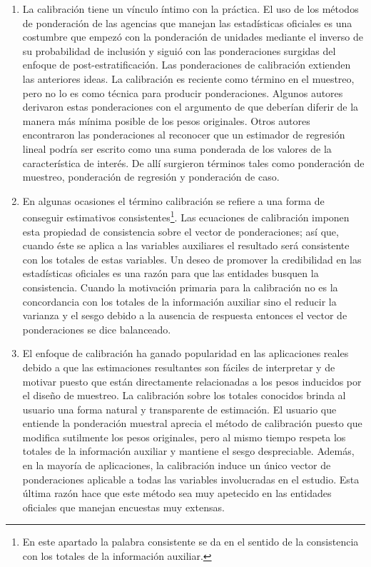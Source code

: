 \documentclass[
  12pt,
  spanish,
]{book}
\begin{document}
\begin{enumerate}
\def\labelenumi{\arabic{enumi}.}
\item
  La calibración tiene un vínculo íntimo con la práctica. El uso de los métodos de ponderación de las agencias que manejan las estadísticas oficiales es una costumbre que empezó con la ponderación de unidades mediante el inverso de su probabilidad de inclusión y siguió con las ponderaciones surgidas del enfoque de post-estratificación. Las ponderaciones de calibración extienden las anteriores ideas. La calibración es reciente como término en el muestreo, pero no lo es como técnica para producir ponderaciones. Algunos autores derivaron estas ponderaciones con el argumento de que deberían diferir de la manera más mínima posible de los pesos originales. Otros autores encontraron las ponderaciones al reconocer que un estimador de regresión lineal podría ser escrito como una suma ponderada de los valores de la característica de interés. De allí surgieron términos tales como ponderación de muestreo, ponderación de regresión y ponderación de caso.
\item
  En algunas ocasiones el término calibración se refiere a una forma de conseguir estimativos consistentes\footnote{En este apartado la palabra consistente se da en el sentido de la consistencia con los totales de la información auxiliar.}. Las ecuaciones de calibración imponen esta propiedad de consistencia sobre el vector de ponderaciones; así que, cuando éste se aplica a las variables auxiliares el resultado será consistente con los totales de estas variables. Un deseo de promover la credibilidad en las estadísticas oficiales es una razón para que las entidades busquen la consistencia. Cuando la motivación primaria para la calibración no es la concordancia con los totales de la información auxiliar sino el reducir la varianza y el sesgo debido a la ausencia de respuesta entonces el vector de ponderaciones se dice balanceado.
\item
  El enfoque de calibración ha ganado popularidad en las aplicaciones reales debido a que las estimaciones resultantes son fáciles de interpretar y de motivar puesto que están directamente relacionadas a los pesos inducidos por el diseño de muestreo. La calibración sobre los totales conocidos brinda al usuario una forma natural y transparente de estimación. El usuario que entiende la ponderación muestral aprecia el método de calibración puesto que modifica sutilmente los pesos originales, pero al mismo tiempo respeta los totales de la información auxiliar y mantiene el sesgo despreciable. Además, en la mayoría de aplicaciones, la calibración induce un único vector de ponderaciones aplicable a todas las variables involucradas en el estudio. Esta última razón hace que este método sea muy apetecido en las entidades oficiales que manejan encuestas muy extensas.

\end{enumerate}
\end{document}
